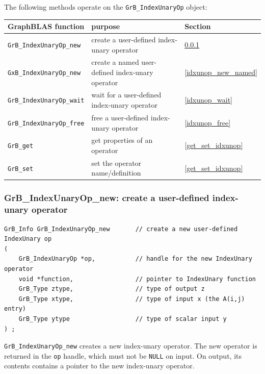 The following methods operate on the \verb'GrB_IndexUnaryOp' object:

\vspace{0.1in}
\noindent
{\footnotesize
\begin{tabular}{lll}
\hline
GraphBLAS function   & purpose                                      & Section \\
\hline
\verb'GrB_IndexUnaryOp_new'   & create a user-defined index-unary operator   & \ref{idxunop_new} \\
\verb'GxB_IndexUnaryOp_new'   & create a named user-defined index-unary operator   & \ref{idxunop_new_named} \\
\verb'GrB_IndexUnaryOp_wait'  & wait for a user-defined index-unary operator  & \ref{idxunop_wait} \\
\verb'GrB_IndexUnaryOp_free'  & free a user-defined index-unary operator      & \ref{idxunop_free} \\
\verb'GrB_get'           & get properties of an operator    & \ref{get_set_idxunop} \\
\verb'GrB_set'           & set the operator name/definition & \ref{get_set_idxunop} \\
\hline
\end{tabular}
}
\vspace{0.1in}

\newpage
\subsubsection{{\sf GrB\_IndexUnaryOp\_new:} create a user-defined index-unary operator}
\label{idxunop_new}

\begin{mdframed}[userdefinedwidth=6in]
{\footnotesize
\begin{verbatim}
GrB_Info GrB_IndexUnaryOp_new       // create a new user-defined IndexUnary op
(
    GrB_IndexUnaryOp *op,           // handle for the new IndexUnary operator
    void *function,                 // pointer to IndexUnary function
    GrB_Type ztype,                 // type of output z
    GrB_Type xtype,                 // type of input x (the A(i,j) entry)
    GrB_Type ytype                  // type of scalar input y
) ;
\end{verbatim} }\end{mdframed}


\verb'GrB_IndexUnaryOp_new' creates a new index-unary operator.  The new operator is
returned in the \verb'op' handle, which must not be \verb'NULL' on input.
On output, its contents contains a pointer to the new index-unary operator.


